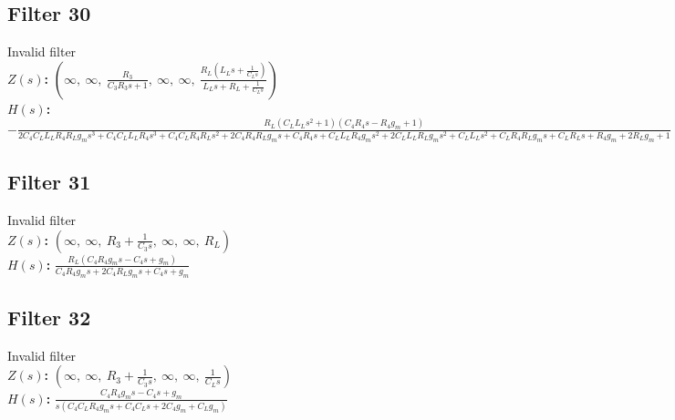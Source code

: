 \documentclass{article}
\begin{document}
\subsection*{Filter 30}
Invalid filter \\ 
\textbf{$Z(s)$:} $\left( \infty, \  \infty, \  \frac{R_{3}}{C_{3} R_{3} s + 1}, \  \infty, \  \infty, \  \frac{R_{L} \left(L_{L} s + \frac{1}{C_{L} s}\right)}{L_{L} s + R_{L} + \frac{1}{C_{L} s}}\right)$ \\ 
\textbf{$H(s)$:} $- \frac{R_{L} \left(C_{L} L_{L} s^{2} + 1\right) \left(C_{4} R_{4} s - R_{4} g_{m} + 1\right)}{2 C_{4} C_{L} L_{L} R_{4} R_{L} g_{m} s^{3} + C_{4} C_{L} L_{L} R_{4} s^{3} + C_{4} C_{L} R_{4} R_{L} s^{2} + 2 C_{4} R_{4} R_{L} g_{m} s + C_{4} R_{4} s + C_{L} L_{L} R_{4} g_{m} s^{2} + 2 C_{L} L_{L} R_{L} g_{m} s^{2} + C_{L} L_{L} s^{2} + C_{L} R_{4} R_{L} g_{m} s + C_{L} R_{L} s + R_{4} g_{m} + 2 R_{L} g_{m} + 1}$ \\ 
\subsection*{Filter 31}
Invalid filter \\ 
\textbf{$Z(s)$:} $\left( \infty, \  \infty, \  R_{3} + \frac{1}{C_{3} s}, \  \infty, \  \infty, \  R_{L}\right)$ \\ 
\textbf{$H(s)$:} $\frac{R_{L} \left(C_{4} R_{4} g_{m} s - C_{4} s + g_{m}\right)}{C_{4} R_{4} g_{m} s + 2 C_{4} R_{L} g_{m} s + C_{4} s + g_{m}}$ \\ 
\subsection*{Filter 32}
Invalid filter \\ 
\textbf{$Z(s)$:} $\left( \infty, \  \infty, \  R_{3} + \frac{1}{C_{3} s}, \  \infty, \  \infty, \  \frac{1}{C_{L} s}\right)$ \\ 
\textbf{$H(s)$:} $\frac{C_{4} R_{4} g_{m} s - C_{4} s + g_{m}}{s \left(C_{4} C_{L} R_{4} g_{m} s + C_{4} C_{L} s + 2 C_{4} g_{m} + C_{L} g_{m}\right)}$ \\ 
\end{document}
